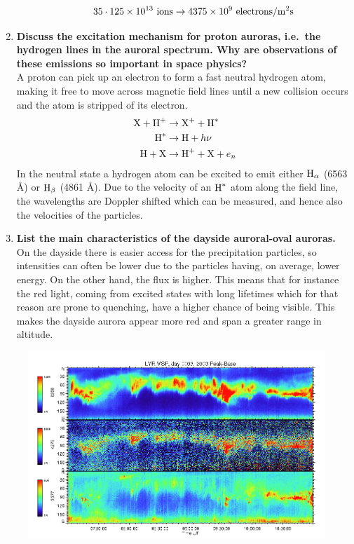 \begin{enumerate}
\begin{enumerate}
\begin{align*}
            35\cdot\num{125e13}\textnormal{ ions}\rightarrow \num{4375e9}\textnormal{ electrons/}\si{\metre^2\second}
        \end{align*}
    \end{enumerate}
    \item \textbf{Discuss the excitation mechanism for proton auroras, i.e.\ the hydrogen lines in the auroral spectrum. Why are observations of these emissions so important in space physics?}\\ A proton can pick up an electron to form a fast neutral hydrogen atom, making it free to move across magnetic field lines until a new collision occurs and the atom is stripped of its electron.
    \begin{align*}
        \textnormal{X}+\textnormal{H}^+&\rightarrow \textnormal{X}^++\textnormal{H}^*\\
        \textnormal{H}^*&\rightarrow \textnormal{H}+h\nu \\
        \textnormal{H}+\textnormal{X}&\rightarrow \textnormal{H}^++\textnormal{X}+e_n
    \end{align*}
    In the neutral state a hydrogen atom can be excited to emit either \(\textnormal{H}_\alpha \) (6563 Å) or \(\textnormal{H}_\beta \) (4861 Å). Due to the velocity of an \(\textnormal{H}^*\) atom along the field line, the wavelengths are Doppler shifted which can be measured, and hence also the velocities of the particles.
    \item \textbf{List the main characteristics of the dayside auroral-oval auroras.}\\ On the dayside there is easier access for the precipitation particles, so intensities can often be lower due to the particles having, on average, lower energy. On the other hand, the flux is higher. This means that for instance the red light, coming from excited states with long lifetimes which for that reason are prone to quenching, have a higher chance of being visible. This makes the dayside aurora appear more red and span a greater range in altitude.
\end{enumerate}
\begin{figure}[ht]
    \centering
    \includegraphics[width=.9\linewidth]{bilder/L4_questions.png}
    \caption{}\label{fig:L4_questions}
\end{figure}